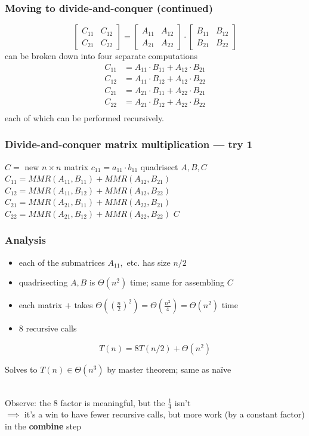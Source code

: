 \documentclass[10pt,aspectratio=169]{beamer}
\newcommand{\stanza}{ \\~\ }
\begin{document}
\begin{frame} \frametitle{Moving to divide-and-conquer (continued)}
\[ \begin{bmatrix} C_{11} & C_{12} \\ C_{21} & C_{22} \end{bmatrix}
   =
   \begin{bmatrix} A_{11} & A_{12} \\ A_{21} & A_{22} \end{bmatrix}
   \cdot
   \begin{bmatrix} B_{11} & B_{12} \\ B_{21} & B_{22} \end{bmatrix} \]
can be broken down into four separate computations
\begin{align*}
  C_{11} &= A_{11} \cdot B_{11} + A_{12} \cdot B_{21} \\
  C_{12} &= A_{11} \cdot B_{12} + A_{12} \cdot B_{22} \\
  C_{21} &= A_{21} \cdot B_{11} + A_{22} \cdot B_{21} \\
  C_{22} &= A_{21} \cdot B_{12} + A_{22} \cdot B_{22} \\
\end{align*}
each of which can be performed recursively.
\end{frame}

\begin{frame} \frametitle{Divide-and-conquer matrix multiplication --- try 1}
  {
  \begin{algorithmic}[1]
    \State $C = $ new $n \times n$ matrix
      \State $c_{11} = a_{11} \cdot b_{11}$
    \Else
      \State quadrisect $A, B, C$
      \State $C_{11} = MMR(A_{11}, B_{11}) + MMR(A_{12}, B_{21})$
      \State $C_{12} = MMR(A_{11}, B_{12}) + MMR(A_{12}, B_{22})$
      \State $C_{21} = MMR(A_{21}, B_{11}) + MMR(A_{22}, B_{21})$
      \State $C_{22} = MMR(A_{21}, B_{12}) + MMR(A_{22}, B_{22})$
    \EndIf
    \State \Return $C$
    \EndFunction
  \end{algorithmic}
  }
\end{frame}

\begin{frame} \frametitle{Analysis}
\begin{itemize}
  \item each of the submatrices $A_{11},$ etc. has size $n/2$
  \item quadrisecting $A, B$ is $\Theta(n^2)$ time; same for assembling $C$
  \item each matrix $+$ takes $\Theta( (\frac{n}{2})^2 ) = \Theta(\frac{n^2}{4}) = \Theta(n^2)$ time
  \item 8 recursive calls
\end{itemize}
\[ T(n) = 8 T(n/2) + \Theta(n^2) \]

Solves to $T(n) \in \Theta(n^3)$ by master theorem; same as na\"ive \stanza

Observe: the 8 factor is meaningful, but the $\frac{1}{4}$ isn't \\
$\implies$ it's a win to have fewer recursive calls, but more work (by a
constant factor) in the \textbf{combine} step
\end{frame}
\end{document}

